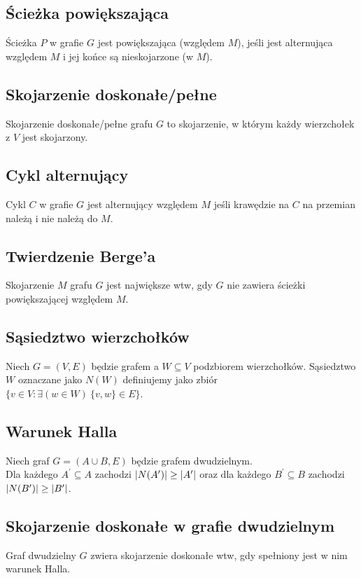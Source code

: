\subsection*{Ścieżka powiększająca}
Ścieżka $P$ w grafie $G$ jest powiększająca (względem $M$), jeśli jest 
alternująca względem $M$ i jej końce są nieskojarzone (w $M$).

\subsection*{Skojarzenie doskonałe/pełne}
Skojarzenie doskonałe/pełne grafu $G$ to skojarzenie, w którym każdy
wierzchołek z $V$ jest skojarzony.

\subsection*{Cykl alternujący}
Cykl $C$ w grafie $G$ jest alternujący względem $M$ jeśli krawędzie na $C$
na przemian należą i nie należą do $M$.

\subsection*{Twierdzenie Berge'a}
Skojarzenie $M$ grafu $G$ jest największe wtw, gdy $G$ nie zawiera ścieżki
powiększającej względem $M$.

\subsection*{Sąsiedztwo wierzchołków}
Niech $G = (V, E)$ będzie grafem a $W \subseteq V$ podzbiorem wierzchołków.
Sąsiedztwo $W$ oznaczane jako $N(W)$ definiujemy jako zbiór \\
$\{ v \in V : \exists(w \in W) \ \{ v, w\} \in E \}$.

\subsection*{Warunek Halla}
Niech graf $G = (A \cup B, E)$ będzie grafem dwudzielnym. \\
Dla każdego $A^\prime \subseteq A$ zachodzi 
$\left| N(A^\prime) \right| \geq \left| A^\prime \right|$ oraz dla każdego $B^\prime \subseteq B$ 
zachodzi $\left| N(B^\prime) \right| \geq \left| B^\prime \right|$.

\subsection*{Skojarzenie doskonałe w grafie dwudzielnym}
Graf dwudzielny $G$ zwiera skojarzenie doskonałe wtw, gdy spełniony jest 
w nim warunek Halla. 